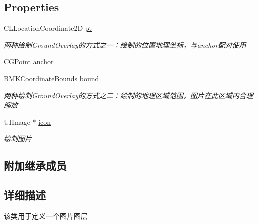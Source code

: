 \subsection*{Properties}
\begin{DoxyCompactItemize}
\item 
\hypertarget{interface_b_m_k_ground_overlay_a99b7330f6eb896adf663b20cfaf0ff3d}{C\-L\-Location\-Coordinate2\-D \hyperlink{interface_b_m_k_ground_overlay_a99b7330f6eb896adf663b20cfaf0ff3d}{pt}}\label{interface_b_m_k_ground_overlay_a99b7330f6eb896adf663b20cfaf0ff3d}

\begin{DoxyCompactList}\small\item\em 两种绘制\-Ground\-Overlay的方式之一：绘制的位置地理坐标，与anchor配对使用 \end{DoxyCompactList}\item 
C\-G\-Point \hyperlink{interface_b_m_k_ground_overlay_a2601d9c702749c36f3c693cdf6165c75}{anchor}
\item 
\hypertarget{interface_b_m_k_ground_overlay_a2cc42179bfa82c4554f1f95c57013daf}{\hyperlink{struct_b_m_k_coordinate_bounds}{B\-M\-K\-Coordinate\-Bounds} \hyperlink{interface_b_m_k_ground_overlay_a2cc42179bfa82c4554f1f95c57013daf}{bound}}\label{interface_b_m_k_ground_overlay_a2cc42179bfa82c4554f1f95c57013daf}

\begin{DoxyCompactList}\small\item\em 两种绘制\-Ground\-Overlay的方式之二：绘制的地理区域范围，图片在此区域内合理缩放 \end{DoxyCompactList}\item 
\hypertarget{interface_b_m_k_ground_overlay_ac6b3c33960c8ae439c387636a27f23a0}{U\-I\-Image $\ast$ \hyperlink{interface_b_m_k_ground_overlay_ac6b3c33960c8ae439c387636a27f23a0}{icon}}\label{interface_b_m_k_ground_overlay_ac6b3c33960c8ae439c387636a27f23a0}

\begin{DoxyCompactList}\small\item\em 绘制图片 \end{DoxyCompactList}\end{DoxyCompactItemize}
\subsection*{附加继承成员}


\subsection{详细描述}
该类用于定义一个图片图层 

